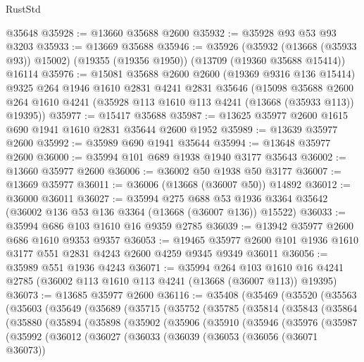 \begin{lexlean}{RustStd}
\begin{coremodule}
    @35648
@35928 := @13660 @35688 @2600
@35932 := @35928 @93 @53 @93 @3203
@35933 := @13669 @35688
@35946 := @35926
    (@35932 (@13668 (@35933 @93)) @15002)
    (@19355 (@19356 @1950))
    (@13709 (@19360 @35688 @15414))
    @16114
@35976 := @15081
    @35688
    @2600
    @2600
    (@19369 @9316 @136 @15414)
    @9325
    @264
    @1946
    @1610
    @2831
    @4241
    @2831
    @35646
    (@15098
      @35688
      @2600
      @264
      @1610
      @4241
      (@35928 @113 @1610 @113 @4241 (@13668 (@35933 @113)) @19395))
@35977 := @15417 @35688
@35987 := @13625 @35977 @2600 @1615 @690 @1941 @1610 @2831 @35644 @2600 @1952
@35989 := @13639 @35977 @2600
@35992 := @35989 @690 @1941 @35644
@35994 := @13648 @35977 @2600
@36000 := @35994 @101 @689 @1938 @1940 @3177 @35643
@36002 := @13660 @35977 @2600
@36006 := @36002 @50 @1938 @50 @3177
@36007 := @13669 @35977
@36011 := @36006 (@13668 (@36007 @50)) @14892
@36012 := @36000 @36011
@36027 := @35994
    @275
    @688
    @53
    @1936
    @3364
    @35642
    (@36002 @136 @53 @136 @3364 (@13668 (@36007 @136)) @15522)
@36033 := @35994 @686 @103 @1610 @16 @9359 @2785
@36039 := @13942 @35977 @2600 @686 @1610 @9353 @9357
@36053 := @19465 @35977 @2600 @101 @1936 @1610 @3177 @551 @2831 @4243 @2600 @4259 @9345 @9349 @36011
@36056 := @35989 @551 @1936 @4243
@36071 := @35994
    @264
    @103
    @1610
    @16
    @4241
    @2785
    (@36002 @113 @1610 @113 @4241 (@13668 (@36007 @113)) @19395)
@36073 := @13685 @35977 @2600
@36116 := @35408
    (@35469
      (@35520
        (@35563
          (@35603
            (@35649
              (@35689
                (@35715
                  (@35752
                    (@35785
                      (@35814
                        (@35843
                          (@35864
                            (@35880
                              (@35894
                                (@35898
                                  (@35902
                                    (@35906
                                      (@35910
                                        (@35946
                                          (@35976
                                            (@35987
                                              (@35992
                                                (@36012
                                                  (@36027
                                                    (@36033
                                                      (@36039
                                                        (@36053
                                                          (@36056 (@36071 @36073))

\end{coremodule}
\end{lexlean}
